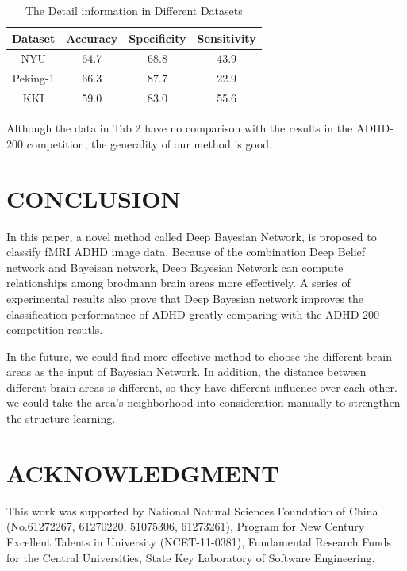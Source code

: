 \documentclass[10pt,twocolumn,letterpaper]{article}
\begin{document}
\begin{table}[h]
\label{tab:2}
\caption{The Detail information in Different Datasets}
\begin{center}
\begin{tabular}{cccc}
\hline

Dataset  	&   Accuracy  	&	Specificity  &	Sensitivity \\
\hline
NYU			&  64.7	&  68.8 & 43.9 \\[2pt]
Peking-1		& 66.3 & 87.7 &22.9\\[2pt]
KKI			& 59.0  & 83.0  & 55.6\\[2pt]
\hline
\end{tabular}
\end{center}
\end{table}


Although the data in Tab 2 have no comparison with the results in the ADHD-200 competition, the generality of our method is good.




\section{CONCLUSION}
In this paper, a novel method called Deep Bayesian Network, is proposed to classify fMRI ADHD image data. Because of the combination Deep Belief network and Bayeisan network, Deep Bayesian Network can compute relationships among brodmann brain areas more effectively. A series of experimental results also prove that Deep Bayesian network  improves the classification performatnce of ADHD greatly comparing with the ADHD-200 competition resutls. 


In the future, we could find more effective method to choose the different brain areas as the input of Bayesian Network. In addition, the distance between different brain areas is different, so they have different influence over each other. we could take  the area's neighborhood into consideration manually to strengthen the structure learning.


\section{ACKNOWLEDGMENT}

This work was supported by National Natural Sciences
Foundation of China (No.61272267, 61270220, 51075306,
61273261), Program for New Century Excellent Talents in
University (NCET-11-0381), Fundamental Research Funds for
the Central Universities, State Key Laboratory of Software
Engineering.

{\small


}
\end{document}
